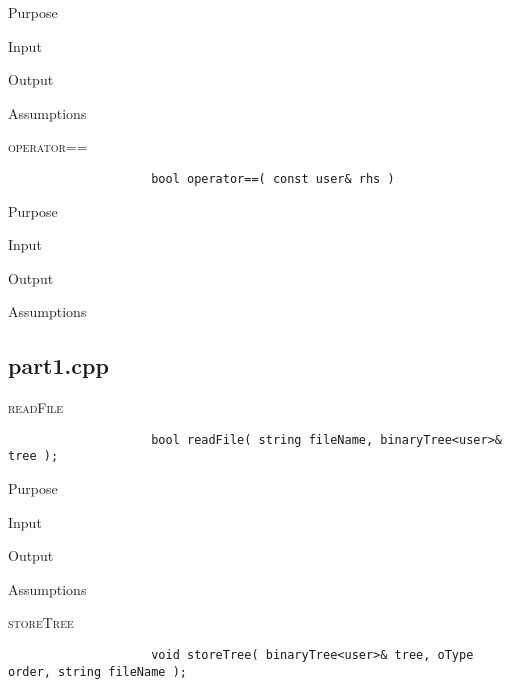 \documentclass[pdftex, 12pt]{article}
\begin{document}
\begin{description}
\begin{description}
\begin{description}
\begin{description}
					\item{Purpose}

					\item{Input}

					\item{Output}

					\item{Assumptions}

				\end{description}
			\item{\textsc{operator==}}
				\begin{lstlisting}
					bool operator==( const user& rhs )
				\end{lstlisting}
				\begin{description}

					\item{Purpose}

					\item{Input}

					\item{Output}

					\item{Assumptions}

				\end{description}

		\end{description}
		\subsection{part1.cpp}
		\begin{description}

			\item{\textsc{readFile}}
				\begin{lstlisting}
					bool readFile( string fileName, binaryTree<user>& tree );
				\end{lstlisting}
				\begin{description}

					\item{Purpose}

					\item{Input}

					\item{Output}

					\item{Assumptions}

				\end{description}
			\item{\textsc{storeTree}}
				\begin{lstlisting}
					void storeTree( binaryTree<user>& tree, oType order, string fileName );
				\end{lstlisting}
				\begin{description}


\end{description}
\end{description}
\end{description}
\end{description}
\end{document}

